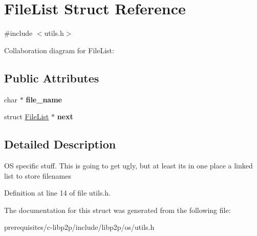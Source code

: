 \hypertarget{struct_file_list}{}\section{File\+List Struct Reference}
\label{struct_file_list}


{\ttfamily \#include $<$utils.\+h$>$}



Collaboration diagram for File\+List\+:
\subsection*{Public Attributes}
\begin{DoxyCompactItemize}
\item 
\mbox{\label{struct_file_list_a6b76c73eae8852a23e587ccb340b39e9}} 
char $\ast$ {\bfseries file\+\_\+name}
\item 
\mbox{\label{struct_file_list_a477cf4d8cc08ee34d390286541e0e733}} 
struct \mbox{\hyperlink{struct_file_list}{File\+List}} $\ast$ {\bfseries next}
\end{DoxyCompactItemize}


\subsection{Detailed Description}
OS specific stuff. This is going to get ugly, but at least its in one place a linked list to store filenames 

Definition at line 14 of file utils.\+h.



The documentation for this struct was generated from the following file\+:\begin{DoxyCompactItemize}
\item 
prerequisites/c-\/libp2p/include/libp2p/os/utils.\+h\end{DoxyCompactItemize}
